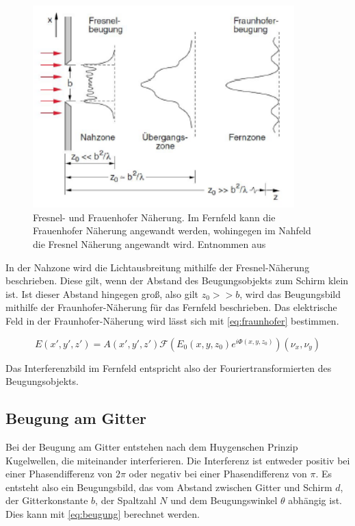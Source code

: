 \begin{figure}[h!]
	\centering
	\includegraphics[width=0.9\textwidth]{abstande.png}
	\caption{Fresnel- und Frauenhofer Näherung. Im Fernfeld kann die Frauenhofer Näherung angewandt werden, wohingegen im Nahfeld die Fresnel Näherung angewandt wird. Entnommen aus \autocite{anleitung-ws2014}}
	\label{Theoriebild}
\end{figure}

In der Nahzone wird die Lichtausbreitung mithilfe der Fresnel-Näherung beschrieben. Diese gilt, wenn der Abstand des Beugungsobjekts zum Schirm klein ist. Ist dieser Abstand hingegen groß, also gilt $z_0 >> b$, wird das Beugungsbild mithilfe der Fraunhofer-Näherung für das Fernfeld beschrieben. Das elektrische Feld in der Fraunhofer-Näherung wird lässt sich mit \cref{eq:fraunhofer} bestimmen.

\begin{equation}
E\left( x', y', z'\right) = A\left( x', y', z'\right) \mathcal{F}\left( E_0\left( x, y, z_0\right) e^{i\Phi\left( x, y, z_0\right) }\right) \left( \nu_x, \nu_y\right) 
\label{eq:fraunhofer}
\end{equation}

Das Interferenzbild im Fernfeld entspricht also der Fouriertransformierten des Beugungsobjekts.

\subsection{Beugung am Gitter}
Bei der Beugung am Gitter entstehen nach dem Huygenschen Prinzip Kugelwellen, die miteinander interferieren. Die Interferenz ist entweder positiv bei einer Phasendifferenz von $2\pi$ oder negativ bei einer Phasendifferenz von $\pi$. Es entsteht also ein Beugungsbild, das vom Abstand zwischen Gitter und Schirm $d$, der Gitterkonstante $b$, der Spaltzahl $N$ und dem Beugungswinkel $\theta$ abhängig ist. Dies kann mit \cref{eq:beugung} berechnet werden.

